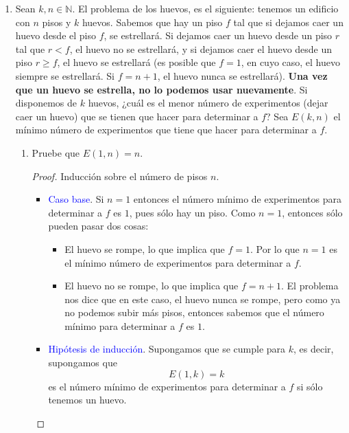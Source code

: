 \documentclass[letterpaper,11pt]{article}
\begin{document}
\begin{enumerate}
    \item Sean $k, n \in \mathbb{N}$. El problema de los huevos, es el 
    siguiente: tenemos un edificio con $n$ pisos y $k$ huevos. Sabemos que hay 
    un piso $f$ tal que si dejamos caer un huevo desde el piso $f$, se 
    estrellará. Si dejamos caer un huevo desde un piso $r$ tal que $r < f$, el 
    huevo no se estrellará, y si dejamos caer el huevo desde un piso 
    $r \geq f$, el huevo se estrellará (es posible que $f = 1$, en cuyo caso, 
    el huevo siempre se estrellará. Si $f = n+1$, el huevo nunca se estrellará).
    \textbf{Una vez que un huevo se estrella, no lo podemos usar nuevamente}. 
    Si disponemos de $k$ huevos, ¿cuál es el menor número de experimentos
    (dejar caer un huevo) que se tienen que hacer para determinar a $f$? Sea 
    $E(k, n)$ el mínimo número de experimentos que tiene que hacer para 
    determinar a $f$.
    \begin{enumerate}
        \item Pruebe que $E(1, n) = n$.
        
        \begin{proof}
            Inducción sobre el número de pisos $n$.
            \begin{itemize}
                \item \textcolor{blue}{Caso base}. Si $n = 1$ entonces 
                el número mínimo de experimentos para determinar a $f$
                es $1$, pues sólo hay un piso. Como $n=1$, entonces 
                sólo pueden pasar dos cosas:
                \begin{itemize}
                    \item El huevo se rompe, lo que implica que $f=1$. Por lo 
                    que $n=1$ es el mínimo número de experimentos para determinar
                    a $f$.

                    \item El huevo no se rompe, lo que implica que $f=n+1$. El 
                    problema nos dice que en este caso, el huevo nunca se rompe, 
                    pero como ya no podemos subir más pisos, entonces sabemos 
                    que el número mínimo para determinar a $f$ es $1$.
                \end{itemize}
                
                \item \textcolor{blue}{Hipótesis de inducción}. Supongamos 
                que se cumple para $k$, es decir, supongamos que 
                \begin{equation*}
                    E(1, k) = k
                \end{equation*}
                es el número mínimo de experimentos para determinar a $f$ si 
                sólo tenemos un huevo.


\end{itemize}
\end{proof}
\end{enumerate}
\end{enumerate}
\end{document}
